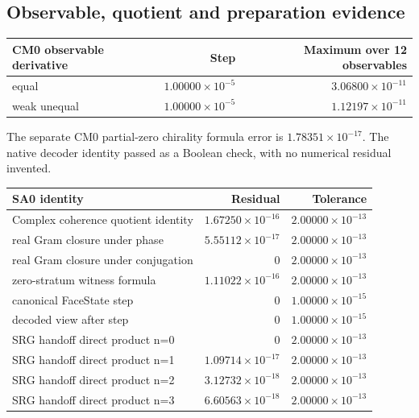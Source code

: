 \subsection*{Observable, quotient and preparation evidence}

\begin{center}\begin{tabular}{@{}lrr@{}}
\toprule
CM0 observable derivative & Step & Maximum over 12 observables\\\midrule
equal & \(1.00000\times10^{-5}\) & \(3.06800\times10^{-11}\)\\
weak unequal & \(1.00000\times10^{-5}\) & \(1.12197\times10^{-11}\)\\
\bottomrule\end{tabular}\end{center}

The separate CM0 partial-zero chirality formula error is \(1.78351\times10^{-17}\). The native decoder identity passed as a Boolean check, with no numerical residual invented.

\begin{center}\begin{tabular}{@{}p{.52\linewidth}rr@{}}
\toprule
SA0 identity & Residual & Tolerance\\\midrule
Complex coherence quotient identity & \(1.67250\times10^{-16}\) & \(2.00000\times10^{-13}\)\\
real Gram closure under phase & \(5.55112\times10^{-17}\) & \(2.00000\times10^{-13}\)\\
real Gram closure under conjugation & 0 & \(2.00000\times10^{-13}\)\\
zero-stratum witness formula & \(1.11022\times10^{-16}\) & \(2.00000\times10^{-13}\)\\
canonical FaceState step & 0 & \(1.00000\times10^{-15}\)\\
decoded view after step & 0 & \(1.00000\times10^{-15}\)\\
SRG handoff direct product n=0 & 0 & \(2.00000\times10^{-13}\)\\
SRG handoff direct product n=1 & \(1.09714\times10^{-17}\) & \(2.00000\times10^{-13}\)\\
SRG handoff direct product n=2 & \(3.12732\times10^{-18}\) & \(2.00000\times10^{-13}\)\\
SRG handoff direct product n=3 & \(6.60563\times10^{-18}\) & \(2.00000\times10^{-13}\)\\
\bottomrule\end{tabular}\end{center}

